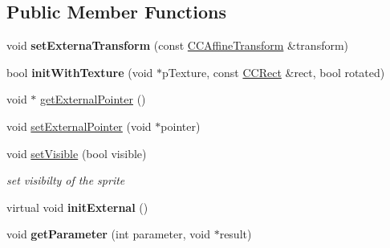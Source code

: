 \subsection*{Public Member Functions}
\begin{DoxyCompactItemize}
\item 
\hypertarget{class_g_a_f_1_1_g_a_f_sprite_a62060dc407edd4be0b4c8d6d2b543f51}{void {\bfseries set\-Externa\-Transform} (const \hyperlink{class_g_a_f_1_1_c_c_affine_transform}{C\-C\-Affine\-Transform} \&transform)}\label{class_g_a_f_1_1_g_a_f_sprite_a62060dc407edd4be0b4c8d6d2b543f51}

\item 
\hypertarget{class_g_a_f_1_1_g_a_f_sprite_a0964b5cbabb853fba085e618de5baa6a}{bool {\bfseries init\-With\-Texture} (void $\ast$p\-Texture, const \hyperlink{class_g_a_f_1_1_c_c_rect}{C\-C\-Rect} \&rect, bool rotated)}\label{class_g_a_f_1_1_g_a_f_sprite_a0964b5cbabb853fba085e618de5baa6a}

\item 
void $\ast$ \hyperlink{class_g_a_f_1_1_g_a_f_sprite_a06cbb88c161385cf028fef400d320f0d}{get\-External\-Pointer} ()
\item 
void \hyperlink{class_g_a_f_1_1_g_a_f_sprite_a7ef1c87d7a159fa3c29fb17c7c481cd0}{set\-External\-Pointer} (void $\ast$pointer)
\item 
\hypertarget{class_g_a_f_1_1_g_a_f_sprite_a337ff41163681341626078f0b20d5eb2}{void \hyperlink{class_g_a_f_1_1_g_a_f_sprite_a337ff41163681341626078f0b20d5eb2}{set\-Visible} (bool visible)}\label{class_g_a_f_1_1_g_a_f_sprite_a337ff41163681341626078f0b20d5eb2}

\begin{DoxyCompactList}\small\item\em set visibilty of the sprite \end{DoxyCompactList}\item 
\hypertarget{class_g_a_f_1_1_g_a_f_sprite_a7d10ff68ee86a4d7efa2a117bde8386c}{virtual void {\bfseries init\-External} ()}\label{class_g_a_f_1_1_g_a_f_sprite_a7d10ff68ee86a4d7efa2a117bde8386c}

\item 
\hypertarget{class_g_a_f_1_1_g_a_f_sprite_a5acd185b3e1e531b1d43b58253852c50}{void {\bfseries get\-Parameter} (int parameter, void $\ast$result)}\label{class_g_a_f_1_1_g_a_f_sprite_a5acd185b3e1e531b1d43b58253852c50}

\end{DoxyCompactItemize}

